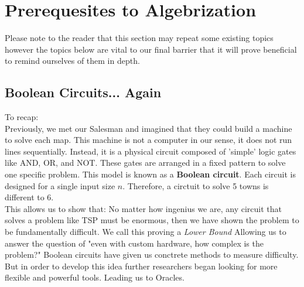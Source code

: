 \documentclass[12pt]{report}
\begin{document}
\newpage
\chapter{Prerequesites to Algebrization}
Please note to the reader that this section may repeat some existing topics however the topics below are vital to our final barrier that it will prove beneficial to remind ourselves of them in depth.

\section{Boolean Circuits... Again}
To recap:\\
Previously, we met our Salesman and imagined that they could build a machine to solve each map.
This machine is not a computer in our sense, it does not run lines sequentially.
Instead, it is a physical circuit composed of 'simple' logic gates like AND, OR, and NOT.
These gates are arranged in a fixed pattern to solve one specific problem.
This model is known as a \textbf{Boolean circuit}.
Each circuit is designed for a single input size $n$.
Therefore, a circtuit to solve 5 towns is different to 6.\\
This allows us to show that: No matter how ingenius we are, any circuit that solves a problem like TSP must be enormous, then we have shown the problem to be fundamentally difficult.
We call this proving a \textit{Lower Bound}
Allowing us to answer the question of "even with custom hardware, how complex is the problem?"
Boolean circuits have given us conctrete methods to measure difficulty.
But in order to develop this idea further researchers began looking for more flexible and powerful tools.
Leading us to Oracles.
\end{document}
